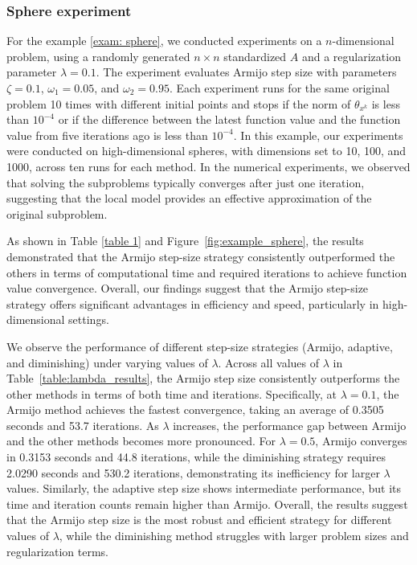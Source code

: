 \documentclass[pdflatex,sn-mathphys-num]{sn-jnl}%
\theoremstyle{definition} %
\theoremstyle{remark} %
\begin{document}
\subsubsection{Sphere experiment}
 For the example \eqref{exam: sphere}, we conducted experiments on a $n$-dimensional problem, using a randomly generated \( n \times n \) standardized \( A \) and a regularization parameter \( \lambda = 0.1 \). The experiment evaluates Armijo step size with parameters \( \zeta = 0.1 \), \( \omega_1 = 0.05 \), and \( \omega_2 = 0.95 \). Each experiment runs for the same original problem 10 times with different initial points and stops if the norm of \(\theta_{x^k}\) is less than \(10^{-4}\) or if the difference between the latest function value and the function value from five iterations ago is less than \(10^{-4}\). 
 In this example, our experiments were conducted on high-dimensional spheres, with dimensions set to 10, 100, and 1000, across ten runs for each method. In the numerical experiments, we observed that solving the subproblems typically converges after just one iteration, suggesting that the local model provides an effective approximation of the original subproblem.

 
As shown in Table \ref{table 1} and Figure~\ref{fig:example_sphere}, the results demonstrated that the Armijo step-size strategy consistently outperformed the others in terms of computational time and required iterations to achieve function value convergence. 
Overall, our findings suggest that the Armijo step-size strategy offers significant advantages in efficiency and speed, particularly in high-dimensional settings. 

We observe the performance of different step-size strategies (Armijo, adaptive, and diminishing) under varying values of \( \lambda \). Across all values of \( \lambda \) in Table~\ref{table:lambda_results}, the Armijo step size consistently outperforms the other methods in terms of both time and iterations. Specifically, at \( \lambda = 0.1 \), the Armijo method achieves the fastest convergence, taking an average of 0.3505 seconds and 53.7 iterations. As \( \lambda \) increases, the performance gap between Armijo and the other methods becomes more pronounced. For \( \lambda = 0.5 \), Armijo converges in 0.3153 seconds and 44.8 iterations, while the diminishing strategy requires 2.0290 seconds and 530.2 iterations, demonstrating its inefficiency for larger \( \lambda \) values. Similarly, the adaptive step size shows intermediate performance, but its time and iteration counts remain higher than Armijo. Overall, the results suggest that the Armijo step size is the most robust and efficient strategy for different values of \( \lambda \), while the diminishing method struggles with larger problem sizes and regularization terms.
\end{document}
